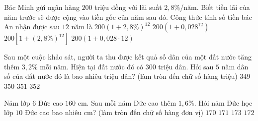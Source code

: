 \begin{vd}%
	Bác Minh gửi ngân hàng $200$ triệu đồng với lãi suất $2{,}8\%$/năm. Biết tiền lãi của năm trước sẽ được cộng vào tiền gốc của năm sau đó. Công thức tính số tiền bác An nhận được sau $12$ năm là
	\choice
	{\True $200\left(1 + 2{,}8\%\right)^{12}$}
	{$200\left(1 + 0{,}028^{12}\right)$}
	{$200\left[1 + (2{,}8\%)^{12}\right]$}
	{$200(1 + 0{,}028 \cdot 12)$}
\end{vd}
\begin{vd}%
	Sau một cuộc khảo sát, người ta thu được kết quả số dân của một đất nước tăng thêm $3{,}2\%$ mỗi năm. Hiện tại đất nước đó có $300$ triệu dân. Hỏi sau $5$ năm dân số của đất nước đó là bao nhiêu triệu dân? (làm tròn đến chữ số hàng triệu)
	\choice
	{$349$}
	{$350$}
	{\True $351$}
	{$352$}
\end{vd}
\begin{vd}%
	Năm lớp $6$ Đức cao $160$ cm. Sau mỗi năm Đức cao thêm $1,6\%$. Hỏi năm Đức học lớp $10$ Đức cao bao nhiêu cm? (làm tròn đến chữ số hàng đơn vị)
	\choice
	{$170$}
	{$171$}
	{\True $173$}
	{$172$}
\end{vd}
